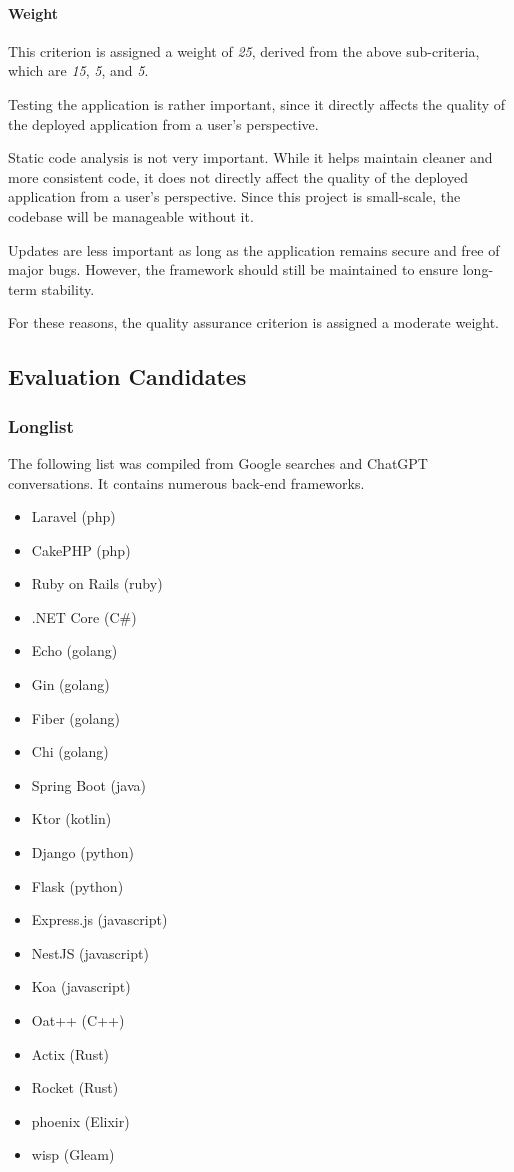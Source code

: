 \paragraph{Weight}
This criterion is assigned a weight of \emph{25}, derived from the above sub-criteria, which are \emph{15}, \emph{5}, and \emph{5}.

Testing the application is rather important, since it directly affects the quality of the deployed application from a user's perspective.

Static code analysis is not very important.
While it helps maintain cleaner and more consistent code, it does not directly affect the quality of the deployed application from a user's perspective.
Since this project is small-scale, the codebase will be manageable without it.

Updates are less important as long as the application remains secure and free of major bugs.
However, the framework should still be maintained to ensure long-term stability.

For these reasons, the quality assurance criterion is assigned a moderate weight.

\subsection{Evaluation Candidates}\label{subsec:candidates}

\subsubsection{Longlist}
The following list was compiled from Google searches and ChatGPT conversations.
It contains numerous back-end frameworks.

\begin{itemize}
    \item Laravel (php)
    \item CakePHP (php)
    \item Ruby on Rails (ruby)
    \item .NET Core (C\#)
    \item Echo (golang)
    \item Gin (golang)
    \item Fiber (golang)
    \item Chi (golang)
    \item Spring Boot (java)
    \item Ktor (kotlin)
    \item Django (python)
    \item Flask (python)
    \item Express.js (javascript)
    \item NestJS (javascript)
    \item Koa (javascript)
    \item Oat++ (C++)
    \item Actix (Rust)
    \item Rocket (Rust)
    \item phoenix (Elixir)
    \item wisp (Gleam)
\end{itemize}

